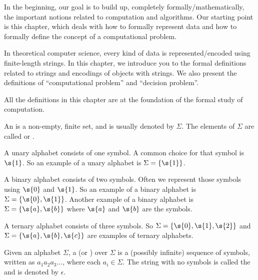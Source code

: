\begin{preamble}
In the beginning, our goal is to build up, completely formally/mathematically, the important notions related to computation and algorithms. Our starting point is this chapter, which deals with how to formally represent data and how to formally define the concept of a computational problem.

In theoretical computer science, every kind of data is represented/encoded using finite-length strings. In this chapter, we introduce you to the formal definitions related to strings and encodings of objects with strings. We also present the definitions of ``computational problem'' and ``decision problem''. 

All the definitions in this chapter are at the foundation of the formal study of computation.
\end{preamble}
\begin{definition} \label{definition:Alphabet-symbol-character}
An  is a non-empty, finite set, and is usually denoted by $\Sigma$. 
The elements of $\Sigma$ are called  or .
\end{definition}

\begin{example} \label{example:Unary-alphabet}
A unary alphabet consists of one symbol. A common choice for that symbol is $\s{1}$. 
So an example of a unary alphabet is $\Sigma = \{\s{1}\}$.
\end{example}

\begin{example} \label{example:Binary-alphabet}
A binary alphabet consists of two symbols. 
Often we represent those symbols using $\s{0}$ and $\s{1}$. 
So an example of a binary alphabet is $\Sigma = \{\s{0},\s{1}\}$.
Another example of a binary alphabet is $\Sigma=\{\s{a},\s{b}\}$ where $\s{a}$ and $\s{b}$ are the symbols.
\end{example}

\begin{example} \label{example:Ternary-alphabet}
A ternary alphabet consists of three symbols. 
So $\Sigma=\{\s{0},\s{1},\s{2}\}$ and $\Sigma=\{\s{a},\s{b},\s{c}\}$ are examples of ternary alphabets. 
\end{example}

\begin{definition} \label{definition:String-word-empty-string}
Given an alphabet $\Sigma$, a  (or ) over $\Sigma$ is a (possibly infinite) sequence of symbols, written as $a_1a_2a_3\ldots$, where each $a_i \in \Sigma$. 
The string with no symbols is called the  and is denoted by $\epsilon$.
\end{definition}

